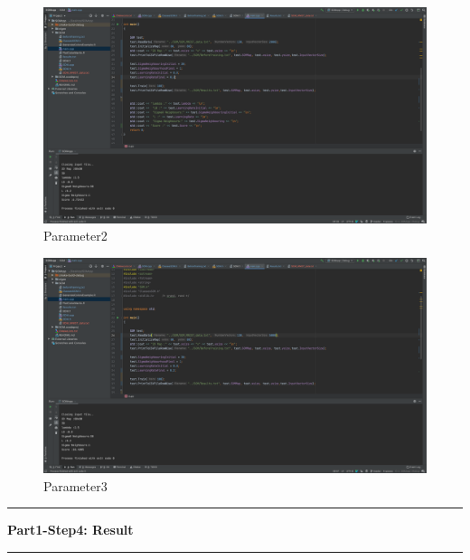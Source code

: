 \documentclass[11pt]{article}
\newcommand\question[2]{\vspace{.25in}\hrule\textbf{#1: #2}\vspace{.5em}\hrule\vspace{.10in}}
\begin{document}
\begin{figure}[H]
    \centering
    \includegraphics[width=1\textwidth]{Fig2}
    \caption{Parameter2}
\end{figure}


\begin{figure}[H]
    \centering
    \includegraphics[width=1\textwidth]{Fig3}
    \caption{Parameter3}
\end{figure}


\question{Part1-Step4}{Result}
\end{document}
